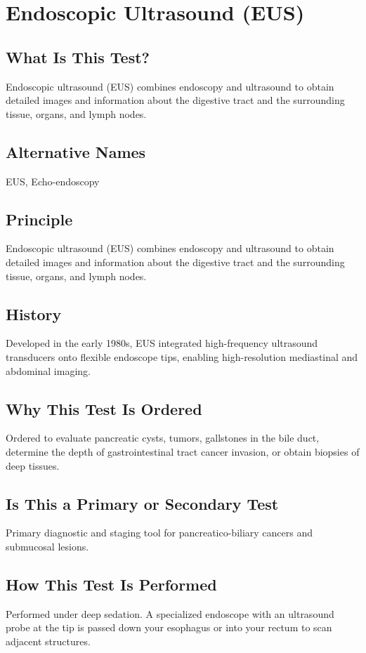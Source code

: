 \chapter{Endoscopic Ultrasound (EUS)}

\section*{What Is This Test?}
Endoscopic ultrasound (EUS) combines endoscopy and ultrasound to obtain detailed images and information about the digestive tract and the surrounding tissue, organs, and lymph nodes.

\section*{Alternative Names}
EUS, Echo-endoscopy

\section*{Principle}
Endoscopic ultrasound (EUS) combines endoscopy and ultrasound to obtain detailed images and information about the digestive tract and the surrounding tissue, organs, and lymph nodes.

\section*{History}
Developed in the early 1980s, EUS integrated high-frequency ultrasound transducers onto flexible endoscope tips, enabling high-resolution mediastinal and abdominal imaging.

\section*{Why This Test Is Ordered}
Ordered to evaluate pancreatic cysts, tumors, gallstones in the bile duct, determine the depth of gastrointestinal tract cancer invasion, or obtain biopsies of deep tissues.

\section*{Is This a Primary or Secondary Test}
Primary diagnostic and staging tool for pancreatico-biliary cancers and submucosal lesions.

\section*{How This Test Is Performed}
Performed under deep sedation. A specialized endoscope with an ultrasound probe at the tip is passed down your esophagus or into your rectum to scan adjacent structures.


